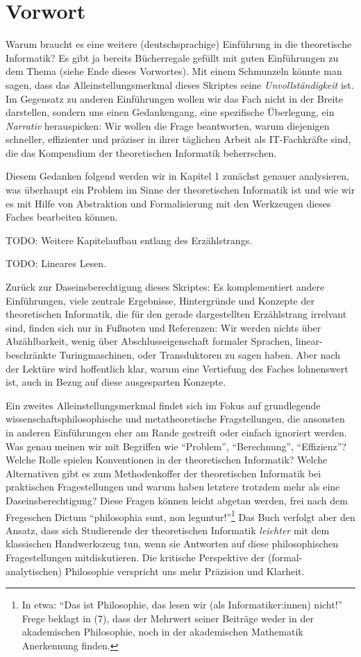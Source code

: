 \chapter{Vorwort}

Warum braucht es eine weitere (deutschsprachige) Einführung
in die theoretische Informatik?
Es gibt ja bereits Bücherregale gefüllt mit guten Einführungen zu dem Thema
(siehe Ende dieses Vorwortes).
Mit einem Schmunzeln könnte man sagen,
dass das Alleinstellungsmerkmal dieses Skriptes seine
\emph{Unvollständigkeit} ist.
Im Gegensatz zu anderen Einführungen wollen wir das Fach nicht in der Breite darstellen,
sondern uns einen Gedankengang, eine spezifische Überlegung,
ein \emph{Narrativ} herauspicken:
Wir wollen die Frage beantworten,
warum diejenigen
schneller, effizienter und präziser
in ihrer täglichen Arbeit als IT-Fachkräfte sind,
die das Kompendium der theoretischen Informatik beherrschen.

Diesem Gedanken folgend werden wir in Kapitel 1 zunächst genauer analysieren,
was überhaupt ein Problem im Sinne der theoretischen Informatik ist
und wie wir es mit Hilfe von Abstraktion und Formalisierung mit den Werkzeugen
dieses Faches bearbeiten können.

TODO: Weitere Kapitelaufbau entlang des Erzählstrangs.

TODO: Lineares Lesen.

Zurück zur Daseinsberechtigung dieses Skriptes:
Es komplementiert andere Einführungen,
viele zentrale Ergebnisse, Hintergründe und Konzepte
der theoretischen Informatik,
die für den gerade dargestellten Erzählstrang irrelvant sind,
finden sich nur in Fußnoten und Referenzen:
Wir werden nichts über Abzählbarkeit,
wenig über Abschlusseigenschaft formaler Sprachen,
linear-beschränkte Turingmaschinen,
oder Transduktoren zu sagen haben.
Aber nach der Lektüre wird hoffentlich klar,
warum eine Vertiefung des Faches lohnenswert ist,
auch in Bezug auf diese ausgesparten Konzepte.

Ein zweites Alleinstellungsmerkmal findet sich im Fokus auf grundlegende
wissenschaftsphilosophische und metatheoretische Fragstellungen,
die ansonsten in anderen Einführungen eher am Rande gestreift
oder einfach ignoriert werden.
Was genau meinen wir mit Begriffen wie ``Problem'', ``Berechnung'', ``Effizienz''?
Welche Rolle spielen Konventionen in der theoretischen Informatik?
Welche Alternativen gibt es zum Methodenkoffer der theoretischen Informatik
bei praktischen Fragestellungen
und warum haben letztere trotzdem mehr als eine Daseinsberechtigung?
Diese Fragen können leicht abgetan werden, frei nach dem Fregeschen Dictum
``philosophia sunt, non leguntur!''\footnote{
    In etwa: ``Das ist Philosophie,
    das lesen wir (als Informatiker:innen) nicht!''
    Frege beklagt in \cite{frege_grundgesetze} (7),
    dass der Mehrwert seiner Beiträge weder in der akademischen Philosophie,
    noch in der akademischen Mathematik Anerkennung finden.
}
Das Buch verfolgt aber den Ansatz,
dass sich Studierende der theoretischen Informatik
\emph {leichter} mit dem klassischen Handwerkszeug tun,
wenn sie Antworten auf diese philosophischen Fragestellungen mitdiskutieren.
Die kritische Perspektive der (formal-analytischen) Philosophie
verspricht uns mehr Präzision und Klarheit.

